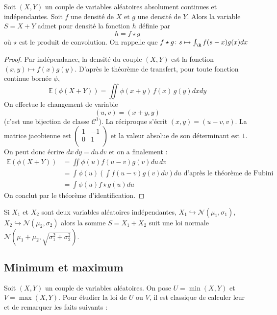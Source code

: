 		\begin{proposition}{}{}
			Soit $(X,Y)$ un couple de variables aléatoires absolument continues et indépendantes. Soit $f$ une densité de $X$ et $g$ une densité de $Y$. Alors la variable $S = X+Y$ admet pour densité la fonction $h$ définie par 
			$$h= f \star g$$
			où $\star$ est le produit de convolution. On rappelle que $f \star g \colon s \mapsto \int_{\R} f(s-x)g(x)dx$
		\end{proposition}
		\begin{proof}
		Par indépendance, la densité du couple $(X,Y)$ est la fonction $(x,y) \mapsto f(x)g(y)$. D'après le théorème de transfert, pour toute fonction continue bornée $\phi$,
		$$\mathbb{E}(\phi(X+Y)) = \iint \phi(x+y)\,f(x)\,g(y)dxdy$$
		On effectue le changement de variable $$(u,v)=(x+y,y)$$ (c'est une bijection de classe $\mathcal{C}^1$). La réciproque s'écrit $(x,y)=(u-v,v)$. La matrice jacobienne est $\begin{pmatrix}
		1 & -1 \\
		0 & 1 \\
		\end{pmatrix} $ et la valeur absolue de son déterminant est $1$. On peut donc écrire $dx\,dy=du\,dv$ et on a finalement  :
	\begin{align*}
	\mathbb{E}(\phi(X+Y)) &=  \iint \phi(u)f(u-v)g(v)du\,dv \\
	&= \int \phi(u) \left( \int f(u-v) g(v)dv \right)du \text{ d'après le théorème de Fubini} \\
	&= \int \phi(u) f\star g(u) du
	\end{align*}
On conclut par le théorème d'identification.
		\end{proof}

		
		\begin{proposition}{}{}
			Si $X_1$ et $X_2$ sont deux variables aléatoires indépendantes, $X_1 \hookrightarrow \mathcal{N}(\mu_1,\sigma_1)$, $X_2 \hookrightarrow \mathcal{N}(\mu_2,\sigma_2)$ alors la somme $S=X_1+X_2$ suit une loi normale $\mathcal{N}(\mu_1 + \mu_2,\sqrt{\sigma_1^2 + \sigma_2^2})$.
		\end{proposition}
		
		\subsection{Minimum et maximum}
		
		Soit $(X,Y)$ un couple de variables aléatoires. On pose $U=\min(X,Y)$ et $V=\max(X,Y)$. Pour étudier la loi de $U$ ou $V$, il est classique de calculer leur  et de remarquer les faits suivants :
		
